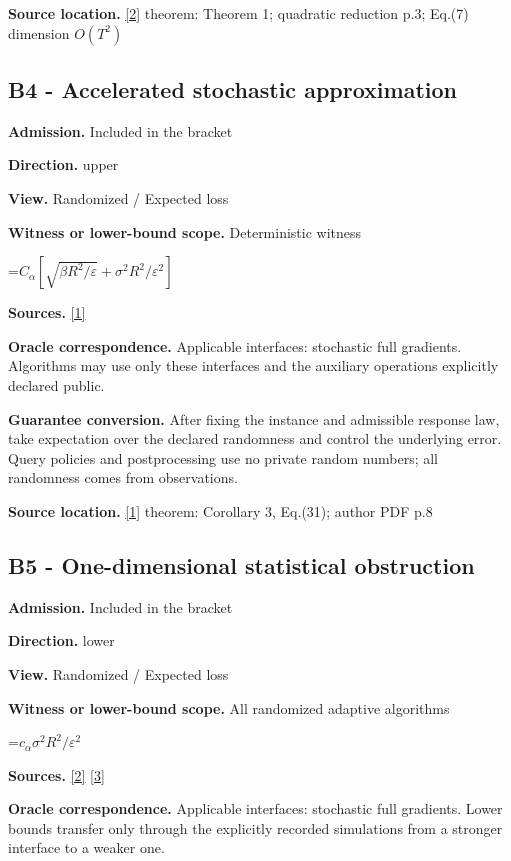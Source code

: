\documentclass[10pt,a4paper]{article}
\newcommand{\AtlasMath}[1]{\par\begingroup\centering\setbox0=\hbox{$\displaystyle #1$}\ifdim\wd0>1.4\linewidth\typeout{ATLAS WIDE FORMULA: \the\wd0}\fi\ifdim\wd0>\linewidth\resizebox{\linewidth}{!}{\box0}\else\box0\fi\par\endgroup}
\begin{document}
\textbf{Source location.} \href{https://arxiv.org/pdf/2609.10874}{[2]} theorem: Theorem 1; quadratic reduction p.3; Eq.(7) dimension $O(T^2)$

\subsection{B4 - Accelerated stochastic approximation}
\textbf{Admission.} Included in the bracket

\textbf{Direction.} upper

\textbf{View.} Randomized / Expected loss

\textbf{Witness or lower-bound scope.} Deterministic witness

\AtlasMath{C_\alpha[\sqrt{\beta R^2/\varepsilon}+\sigma^2R^2/\varepsilon^2]}
\textbf{Sources.} \href{https://optimization-online.org/wp-content/uploads/2008/08/2061.pdf}{[1]}

\textbf{Oracle correspondence.} Applicable interfaces: stochastic full gradients. Algorithms may use only these interfaces and the auxiliary operations explicitly declared public.

\textbf{Guarantee conversion.} After fixing the instance and admissible response law, take expectation over the declared randomness and control the underlying error. Query policies and postprocessing use no private random numbers; all randomness comes from observations.

\textbf{Source location.} \href{https://optimization-online.org/wp-content/uploads/2008/08/2061.pdf}{[1]} theorem: Corollary 3, Eq.(31); author PDF p.8

\subsection{B5 - One-dimensional statistical obstruction}
\textbf{Admission.} Included in the bracket

\textbf{Direction.} lower

\textbf{View.} Randomized / Expected loss

\textbf{Witness or lower-bound scope.} All randomized adaptive algorithms

\AtlasMath{c_\alpha \sigma^2R^2/\varepsilon^2}
\textbf{Sources.} \href{https://arxiv.org/pdf/2609.10874}{[2]} \href{https://proceedings.mlr.press/v202/sadiev23a/sadiev23a.pdf}{[3]}

\textbf{Oracle correspondence.} Applicable interfaces: stochastic full gradients. Lower bounds transfer only through the explicitly recorded simulations from a stronger interface to a weaker one.
\end{document}
